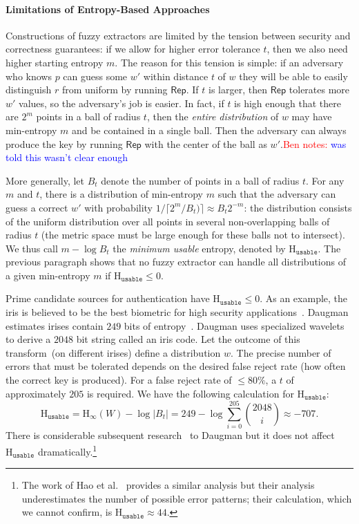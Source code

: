 \documentclass[11pt]{article}
\newcommand{\class}[1]{{\ensuremath{\mathsf{#1}}}}
\newcommand{\rep}{\ensuremath{\class{Rep}}\xspace}
\newcommand{\Hoo}{\mathrm{H}_\infty}
\newcommand{\Huse}{\mathrm{H}_{\mathtt{usable}}}
\newcommand{\authnote}[2]{{\textcolor{red}{\textsf{#1 notes: }\textcolor{blue}{ #2}}\marginpar{\textcolor{red}{\textbf{!!!!!}}}}}
\newcommand{\authnote}[2]{}
\newcommand{\bnote}[1]{{\authnote{Ben}{#1}}}
\begin{document}
\paragraph{Limitations of Entropy-Based Approaches}
Constructions of fuzzy extractors are limited by the tension between security and correctness guarantees: if we allow for higher error tolerance $t$, then we also need higher starting entropy $m$. The reason for this tension is simple: if an adversary who knows $p$ can guess some $w'$ within distance $t$ of $w$ they will be able to easily distinguish $r$ from uniform by running $\rep$. If $t$ is larger, then $\rep$ tolerates more $w'$ values, so the adversary's job is easier. In fact, if $t$ is high enough that there are $2^m$ points in a ball of radius $t$, then the \emph{entire distribution} of $w$ may have min-entropy $m$ and be contained in a single ball.  Then the adversary can always produce the key by running $\rep$ with the center of the ball as $w'$.\bnote{was told this wasn't clear enough}

More generally, let $B_t$ denote the number of points in a ball of radius $t$. For any $m$ and $t$, there is a distribution of min-entropy $m$ such that the adversary can guess a correct $w'$ with probability $1/\lceil 2^m/B_t) \rceil\approx B_t 2^{-m}$: the distribution consists of the uniform distribution over all points in several non-overlapping balls of radius $t$ (the metric space must be large enough for these balls not to intersect). We thus call $m-\log B_t$ the \emph{minimum usable} entropy, denoted by $\Huse$. The previous paragraph shows that  no fuzzy extractor can handle all distributions of a given min-entropy $m$ if  $\Huse\le 0$.

Prime candidate sources for authentication have $\Huse\le 0$.  As an example, the iris is believed to be the best biometric for high security applications~\cite{prabhakar2003biometric}.  Daugman estimates irises contain $249$ bits of entropy~\cite{daugman2004}.  Daugman uses specialized wavelets to derive a $2048$ bit string called an iris code.  Let the outcome of this transform~(on different irises) define a distribution $w$.  The precise number of errors that must be tolerated depends on the desired false reject rate (how often the correct key is produced).  For a false reject rate of $\le 80\%$, a $t$ of approximately $205$ is required.  We have the following calculation for $\Huse$:
\[
\Huse = \Hoo(W) - \log |B_t|
= 249 - \log \sum_{i=0}^{205} {2048 \choose i} \approx -707.
\]
There is considerable subsequent research~\cite{gentile2009slic,gentile2009efficient,rathgeb2011combining} to Daugman but it does not affect $\Huse$ dramatically.\footnote{The work of Hao et al.~\cite[Section 4.3]{hao2006combining} provides a similar analysis but their analysis underestimates the number of possible error patterns; their calculation, which we cannot confirm, is $\Huse \approx 44$.}  
\end{document}
